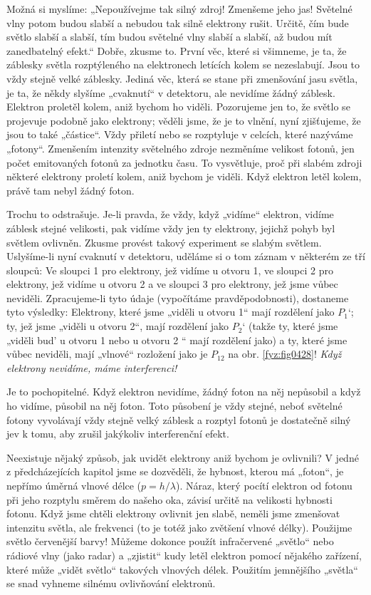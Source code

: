     Možná si myslíme: „Nepoužívejme tak silný zdroj! Zmenšeme jeho jas! Světelné vlny potom budou
    slabší a nebudou tak silně elektrony rušit. Určitě, čím bude světlo slabší a slabší, tím budou
    světelné vlny slabší a slabší, až budou mít zanedbatelný efekt.“ Dobře, zkusme to. První věc,
    které si všimneme, je ta, že záblesky světla rozptýleného na elektronech letících kolem se
    nezeslabují. Jsou to vždy stejně velké záblesky. Jediná věc, která se stane při zmenšování jasu
    světla, je ta, že někdy slyšíme „cvaknutí“ v detektoru, ale nevidíme žádný záblesk. Elektron
    proletěl kolem, aniž bychom ho viděli. Pozorujeme jen to, že světlo se projevuje podobně jako
    elektrony; věděli jsme, že je to vlnění, nyní zjišťujeme, že jsou to také „částice“. Vždy
    přiletí nebo se rozptyluje v celcích, které nazýváme „fotony“. Zmenšením intenzity světelného
    zdroje nezměníme velikost fotonů, jen počet emitovaných fotonů za jednotku času. To vysvětluje,
    proč při slabém zdroji některé elektrony proletí kolem, aniž bychom je viděli. Když elektron
    letěl kolem, právě tam nebyl žádný foton.

    Trochu to odstrašuje. Je-li pravda, že vždy, když „vidíme“ elektron, vidíme záblesk stejné
    velikosti, pak vidíme vždy jen ty elektrony, jejichž pohyb byl světlem ovlivněn. Zkusme provést
    takový experiment se slabým světlem. Uslyšíme-li nyní cvaknutí v detektoru, uděláme si o tom
    záznam v některém ze tří sloupců: Ve sloupci 1 pro elektrony, jež vidíme u otvoru 1, ve sloupci
    2 pro elektrony, jež vidíme u otvoru 2 a ve sloupci 3 pro elektrony, jež jsme vůbec neviděli.
    Zpracujeme-li tyto údaje (vypočítáme pravděpodobnosti), dostaneme tyto výsledky: Elektrony,
    které jsme „viděli u otvoru 1“ mají rozdělení jako \(P_1‘\); ty, jež jsme „viděli u otvoru 2“,
    mají rozdělení jako \(P_2‘\) (takže ty, které jsme „viděli bud' u otvoru 1 nebo u otvoru 2 “
    mají rozdělení jako) a ty, které jsme vůbec neviděli, mají „vlnové“ rozložení jako je \(P_{12}\)
    na obr. \ref{fyz:fig0428}! \emph{Když elektrony nevidíme, máme interferenci!}
    
    Je to pochopitelné. Když elektron nevidíme, žádný foton na něj nepůsobil a když ho vidíme,
    působil na něj foton. Toto působení je vždy stejné, neboť světelné fotony vyvolávají vždy stejně
    velký záblesk a rozptyl fotonů je dostatečně silný jev k tomu, aby zrušil jakýkoliv
    interferenční efekt.
    
    Neexistuje nějaký způsob, jak uvidět elektrony aniž bychom je ovlivnili? V jedné z
    předcházejících kapitol jsme se dozvěděli, že hybnost, kterou má „foton“, je nepřímo úměrná
    vlnové délce (\(p= h/\lambda\)). Náraz, který pocítí elektron od fotonu při jeho rozptylu směrem
    do našeho oka, závisí určitě na velikosti hybnosti fotonu. Když jsme chtěli elektrony ovlivnit
    jen slabě, neměli jsme zmenšovat intenzitu světla, ale frekvenci (to je totéž jako zvětšení
    vlnové délky). Použijme světlo červenější barvy! Můžeme dokonce použít infračervené „světlo“
    nebo rádiové vlny (jako radar) a „zjistit“ kudy letěl elektron pomocí nějakého zařízení, které
    může „vidět světlo“ takových vlnových délek. Použitím jemnějšího „světla“ se snad vyhneme
    silnému ovlivňování elektronů.
    
